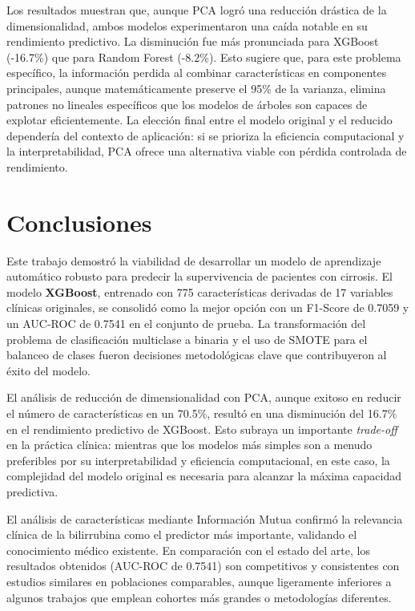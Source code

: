 \documentclass[journal]{IEEEtai}
\begin{document}
Los resultados muestran que, aunque PCA logró una reducción drástica de la dimensionalidad, ambos modelos experimentaron una caída notable en su rendimiento predictivo. La disminución fue más pronunciada para XGBoost (-16.7\%) que para Random Forest (-8.2\%). Esto sugiere que, para este problema específico, la información perdida al combinar características en componentes principales, aunque matemáticamente preserve el 95\% de la varianza, elimina patrones no lineales específicos que los modelos de árboles son capaces de explotar eficientemente. La elección final entre el modelo original y el reducido dependería del contexto de aplicación: si se prioriza la eficiencia computacional y la interpretabilidad, PCA ofrece una alternativa viable con pérdida controlada de rendimiento.

\section{Conclusiones}
Este trabajo demostró la viabilidad de desarrollar un modelo de aprendizaje automático robusto para predecir la supervivencia de pacientes con cirrosis. El modelo \textbf{XGBoost}, entrenado con 775 características derivadas de 17 variables clínicas originales, se consolidó como la mejor opción con un F1-Score de 0.7059 y un AUC-ROC de 0.7541 en el conjunto de prueba. La transformación del problema de clasificación multiclase a binaria y el uso de SMOTE para el balanceo de clases fueron decisiones metodológicas clave que contribuyeron al éxito del modelo.

El análisis de reducción de dimensionalidad con PCA, aunque exitoso en reducir el número de características en un 70.5\%, resultó en una disminución del 16.7\% en el rendimiento predictivo de XGBoost. Esto subraya un importante \textit{trade-off} en la práctica clínica: mientras que los modelos más simples son a menudo preferibles por su interpretabilidad y eficiencia computacional, en este caso, la complejidad del modelo original es necesaria para alcanzar la máxima capacidad predictiva.

El análisis de características mediante Información Mutua confirmó la relevancia clínica de la bilirrubina como el predictor más importante, validando el conocimiento médico existente. En comparación con el estado del arte, los resultados obtenidos (AUC-ROC de 0.7541) son competitivos y consistentes con estudios similares en poblaciones comparables, aunque ligeramente inferiores a algunos trabajos que emplean cohortes más grandes o metodologías diferentes.
\end{document}

